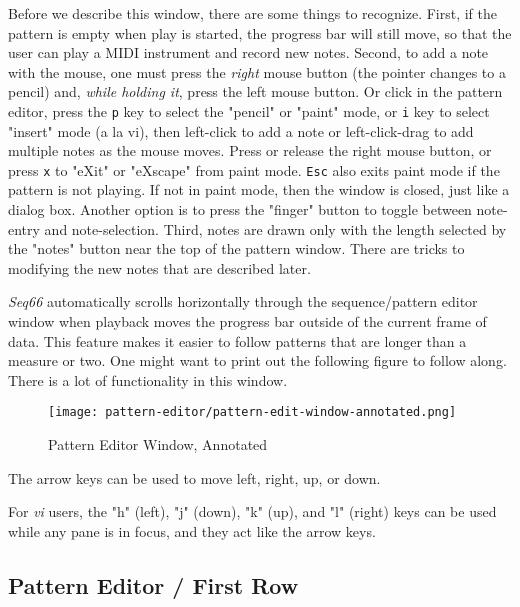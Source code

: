    Before we describe this window, there are some things to recognize.
   First, if the pattern is empty when play is started, the progress bar will
   still move, so that the user can play a MIDI instrument and record new notes.
   Second, to add a note with the mouse, one must press the \textsl{right}
   mouse button (the pointer changes to a pencil) and,
   \textsl{while holding it}, press the left mouse button.
   Or click in the pattern editor, press the
   \texttt{p} key to select the "pencil" or "paint" mode,
   or
   \texttt{i} key to select "insert" mode (a la vi),
   then
   left-click to add a note or
   left-click-drag to add multiple notes as the mouse moves.
   Press or release the right mouse button, or press
   \texttt{x} to "eXit" or "eXscape" from paint mode.
   \texttt{Esc} also exits paint mode if the pattern is not playing.
   If not in paint mode, then the window is closed, just like a dialog box.
   Another option is to press the "finger" button to toggle between note-entry
   and note-selection.
   Third, notes are drawn only with the length selected by the "notes" button
   near the top of the pattern window.  There are tricks to
   modifying the new notes that are described later.

   \textsl{Seq66} automatically scrolls
   horizontally through the sequence/pattern editor window when
   playback moves the progress bar outside of the current frame of data.  This
   feature makes it easier to follow patterns that are longer than a measure or
   two.
   One might want to print out the following figure to follow along.  There is
   a lot of functionality in this window.

\begin{figure}[H]
   \centering 
   \texttt{[image: pattern-editor/pattern-edit-window-annotated.png]}
   \caption{Pattern Editor Window, Annotated}
   \label{fig:pattern_editor_window_annotated}
\end{figure}

   The arrow keys can be used to move left, right, up, or down.

   For \textsl{vi} users, the "h" (left), "j" (down), "k" (up), and "l" (right)
   keys can be used while any pane is in focus, and they act like the arrow
   keys.

\subsection{Pattern Editor / First Row}
\label{subsec:pattern_editor_first_row}

